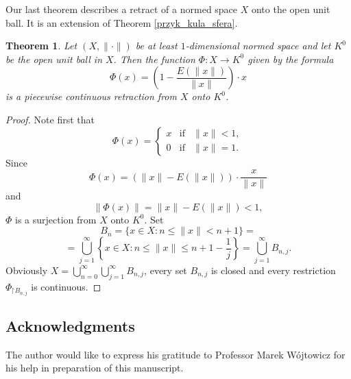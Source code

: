 \documentclass{amsart}
\newtheorem{Th}{Theorem}
\theoremstyle{definition}
\newcommand\restr{\mathord{\restriction}}
\newcommand\cn{\colon}
\newcommand\mn{\leqslant}
\newcommand\fii{{\varphi}}
\begin{document}
Our last theorem describes a retract of a normed space $X$ onto the open unit ball.
It is an extension of Theorem \ref{przyk_kula_sfera}.

\begin{Th}
Let $(X,\|\cdot\|)$ be at least $1$-dimensional normed space and let $K^0$ be the open unit ball in $X$.
Then the function $\Phi\cn X\to K^0$ given by the formula
$$
\Phi(x)=\left(1-\frac{E(\|x\|)}{\|x\|}\right)\cdot x
$$
is a piecewise continuous retraction from $X$ onto $K^0$.
\end{Th}

\begin{proof}
Note first that
$$
\Phi(x)=\left\{\begin{array}{lll}
x & \textrm{if} & \|x\|<1,\\
0 & \textrm{if} & \|x\|=1.
\end{array} \right.
$$
Since
$$\Phi(x)=(\|x\|-E(\|x\|))\cdot\frac{x}{\|x\|}$$
and 
$$\|\Phi(x)\|=\|x\|-E(\|x\|)<1,$$
 $\Phi$ is a surjection from $X$ onto $K^0$. Set
$$
B_n=\{x\in X:n\mn\|x\|<n+1\}=
$$
$$
=\bigcup_{j=1}^\infty\left\{x\in X:n\mn\|x\|\mn n+1-\frac{1}{j}\right\}=\bigcup_{j=1}^\infty B_{n,j}.
$$
Obviously $X=\bigcup\limits_{n=0}^\infty\bigcup\limits_{j=1}^\infty B_{n,j}$, every set $B_{n,j}$ is closed and every restriction $\Phi_{\restr B_{n,j}}$ is continuous.
\end{proof}

\subsection*{Acknowledgments}
The author would like to express his gratitude to Professor Marek Wójtowicz for his help in preparation of this manuscript.
\end{document}
